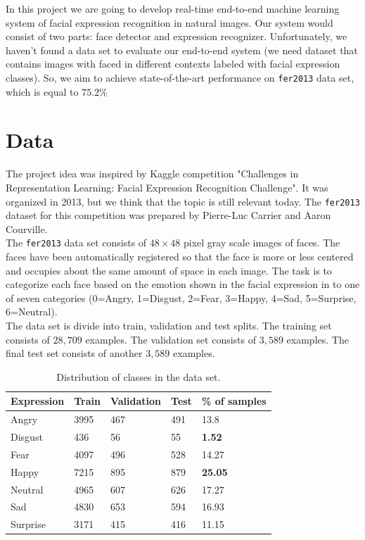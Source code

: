 In this project we are going to develop real-time end-to-end machine learning system of facial expression recognition in natural images. Our system would consist of two parts: face detector and expression recognizer. Unfortunately, we haven't found a data set to evaluate our end-to-end system (we need dataset that contains images with faced in different contexts labeled with facial expression classes). So, we aim to achieve state-of-the-art performance on \texttt{fer2013} data set, which is equal to $75.2\%$

\section{Data}

The project idea was inspired by Kaggle competition "Challenges in Representation Learning: Facial Expression Recognition Challenge". It was organized in 2013, but we think that the topic is still relevant today. The \texttt{fer2013} dataset \cite{dataset} for this competition was prepared by Pierre-Luc Carrier and Aaron Courville.\\

The \texttt{fer2013} data set consists of $48\times48$ pixel gray scale images of faces. The faces have been automatically registered so that the face is more or less centered and occupies about the same amount of space in each image. The task is to categorize each face based on the emotion shown in the facial expression in to one of seven categories (0=Angry, 1=Disgust, 2=Fear, 3=Happy, 4=Sad, 5=Surprise, 6=Neutral).\\

The data set is divide into train, validation and test splits. The training set consists of $28,709$ examples. The validation set consists of $3,589$ examples. The final test set consists of another $3,589$ examples.\\

\begin{table}[H]
	\centering
	\begin{tabular}{ | l | l | l | l | l | }
		\hline
		Expression & Train & Validation & Test & \% of samples \\ \hline
		Angry & 3995 & 467 & 491 & 13.8 \\ %
		Disgust & 436 & 56 & 55 & \textbf{1.52} \\ %
		Fear & 4097 & 496 & 528 & 14.27 \\ %
		Happy & 7215 & 895 & 879 & \textbf{25.05} \\ %
		Neutral & 4965 & 607 & 626 & 17.27 \\ %
		Sad & 4830 & 653 & 594 & 16.93 \\ %
		Surprise & 3171 & 415 & 416 & 11.15 \\ 
		\hline
	\end{tabular}
	\caption{Distribution of classes in the data set.}
\end{table}

